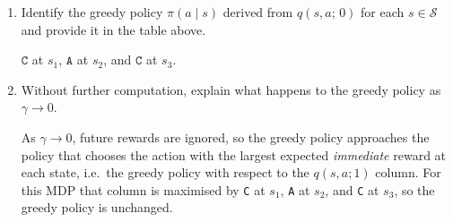 \begin{enumerate}
\begin{solution}
\[
q(s_1,\texttt{C};1)=\tfrac12(3)+\tfrac12(3)=3,\quad
q(s_2,\texttt{C};1)=\tfrac12(1)+\tfrac12(5)=3,\quad
q(s_3,\texttt{A};1)=\tfrac12(1)+\tfrac12(3)=2,
\]
and the remaining (deterministic) actions inherit their listed rewards. Hence
\[
\max_{a}q(s_1,a;1)=3,\qquad \max_{a}q(s_2,a;1)=4,\qquad \max_{a}q(s_3,a;1)=4.
\]
At $t=0$, with $\gamma=0.9$:
\begin{align*}
q(s_1,\texttt{A};0)&=2+0.9(4)=5.60, &
q(s_1,\texttt{B};0)&=1+0.9(4)=4.60, \\
q(s_1,\texttt{C};0)&=\tfrac12\bigl[3+0.9(4)\bigr]+\tfrac12\bigl[3+0.9(4)\bigr]=6.60, &
q(s_2,\texttt{A};0)&=4+0.9(3)=6.70, \\
q(s_2,\texttt{B};0)&=2+0.9(4)=5.60, &
q(s_2,\texttt{C};0)&=\tfrac12\bigl[1+0.9(3)\bigr]+\tfrac12\bigl[5+0.9(4)\bigr]=6.15, \\
q(s_3,\texttt{A};0)&=\tfrac12\bigl[1+0.9(3)\bigr]+\tfrac12\bigl[3+0.9(4)\bigr]=5.15, &
q(s_3,\texttt{B};0)&=2+0.9(4)=5.60, \\
q(s_3,\texttt{C};0)&=4+0.9(4)=7.60. &&
\end{align*}
\end{solution}
\item \points[2] Identify the greedy policy $\pi(a\mid s)$ derived from $q(s,a;\,0)$
for each $s \in \mathcal{S}$ and provide it in the table above.
\begin{solution}
$\texttt{C}$ at $s_1$, $\texttt{A}$ at $s_2$, and $\texttt{C}$ at $s_3$.
\end{solution}
\item \points[2] Without further computation, explain what happens to the greedy policy as $\gamma \to 0$.
\begin{solution}
As $\gamma \to 0$, future rewards are ignored, so the greedy policy approaches the policy that chooses the action with the largest expected \emph{immediate} reward at each state, i.e.\ the greedy policy with respect to the $q(s,a;1)$ column. For this MDP that column is maximised by \texttt{C} at $s_1$, \texttt{A} at $s_2$, and \texttt{C} at $s_3$, so the greedy policy is unchanged.
\end{solution}
\vspace{60pt}
\end{enumerate}
\clearpage
